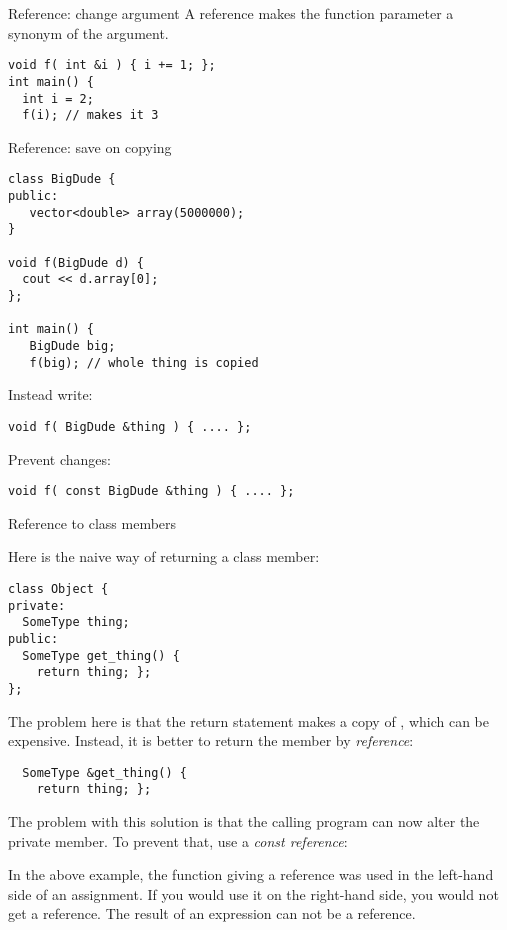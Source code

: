 \begin{block}{Reference: change argument}
\label{sl:refarg-change}
A reference makes the function parameter a synonym of the argument.
\begin{lstlisting}
void f( int &i ) { i += 1; };
int main() {
  int i = 2;
  f(i); // makes it 3
\end{lstlisting}
\end{block}

\begin{block}{Reference: save on copying}
\label{sl:refarg-nocopy}
\begin{multicols}{2}
\begin{lstlisting}
class BigDude {
public:
   vector<double> array(5000000);
}

void f(BigDude d) {
  cout << d.array[0];
};

int main() {
   BigDude big;
   f(big); // whole thing is copied
\end{lstlisting}
\columnbreak
Instead write:
\begin{lstlisting}
void f( BigDude &thing ) { .... };
\end{lstlisting}
Prevent changes:
\begin{lstlisting}
void f( const BigDude &thing ) { .... };
\end{lstlisting}
\hbox{}\vfill\hbox{}
\end{multicols}
\end{block}

 {Reference to class members}
\label{sec:class-ref}

Here is the naive way of returning a class member:
\begin{lstlisting}
class Object {
private:
  SomeType thing;
public:
  SomeType get_thing() {
    return thing; };
};
\end{lstlisting}
The problem here is that the return statement makes a copy of
, which can be expensive. Instead, it is better to return the
member by \emph{reference}:
\begin{lstlisting}
  SomeType &get_thing() { 
    return thing; };
\end{lstlisting}
The problem with this solution is that the calling program can now
alter the private member. To prevent that, use a
\emph{const reference}:
%

In the above example, the function giving a reference was used in the left-hand side of
an assignment. If you would use it on the right-hand side, you would
not get a reference. The result of an expression can not be a
reference.


